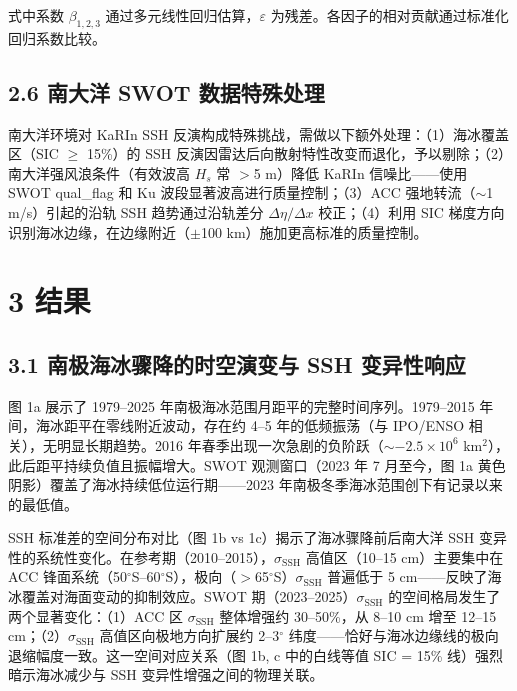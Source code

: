 \documentclass[11pt,a4paper]{article}
\begin{document}
式中系数 $\beta_{1,2,3}$ 通过多元线性回归估算，$\varepsilon$ 为残差。各因子的相对贡献通过标准化回归系数比较。\par

\subsection*{2.6  南大洋 SWOT 数据特殊处理}

南大洋环境对 KaRIn SSH 反演构成特殊挑战，需做以下额外处理：（1）海冰覆盖区（SIC $\geq$ 15\%）的 SSH 反演因雷达后向散射特性改变而退化，予以剔除；（2）南大洋强风浪条件（有效波高 $H_s$ 常 $>$5 m）降低 KaRIn 信噪比——使用 SWOT qual\_flag 和 Ku 波段显著波高进行质量控制；（3）ACC 强地转流（$\sim$1 m/s）引起的沿轨 SSH 趋势通过沿轨差分 $\Delta\eta/\Delta x$ 校正；（4）利用 SIC 梯度方向识别海冰边缘，在边缘附近（$\pm$100 km）施加更高标准的质量控制。\par

\section*{3  结果}

\subsection*{3.1  南极海冰骤降的时空演变与 SSH 变异性响应}

图 1a 展示了 1979--2025 年南极海冰范围月距平的完整时间序列。1979--2015 年间，海冰距平在零线附近波动，存在约 4--5 年的低频振荡（与 IPO/ENSO 相关），无明显长期趋势。2016 年春季出现一次急剧的负阶跃（$\sim -2.5 \times 10^6$ km$^2$），此后距平持续负值且振幅增大。SWOT 观测窗口（2023 年 7 月至今，图 1a 黄色阴影）覆盖了海冰持续低位运行期——2023 年南极冬季海冰范围创下有记录以来的最低值。\par

SSH 标准差的空间分布对比（图 1b vs 1c）揭示了海冰骤降前后南大洋 SSH 变异性的系统性变化。在参考期（2010--2015），$\sigma_{\text{SSH}}$ 高值区（10--15 cm）主要集中在 ACC 锋面系统（50$^\circ$S--60$^\circ$S），极向（$>$65$^\circ$S）$\sigma_{\text{SSH}}$ 普遍低于 5 cm——反映了海冰覆盖对海面变动的抑制效应。SWOT 期（2023--2025）$\sigma_{\text{SSH}}$ 的空间格局发生了两个显著变化：（1）ACC 区 $\sigma_{\text{SSH}}$ 整体增强约 30--50\%，从 8--10 cm 增至 12--15 cm；（2）$\sigma_{\text{SSH}}$ 高值区向极地方向扩展约 2--3$^\circ$ 纬度——恰好与海冰边缘线的极向退缩幅度一致。这一空间对应关系（图 1b, c 中的白线等值 SIC = 15\% 线）强烈暗示海冰减少与 SSH 变异性增强之间的物理关联。\par
\end{document}
